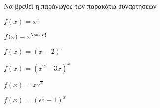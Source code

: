 Να βρεθεί η παράγωγος των παρακάτω συναρτήσεων
\begin{alist}
\item $ f(x)=x^x $
\item $ f(x)=x^{\hm{x}} $
\item $ f(x)=(x-2)^x $
\item $ f(x)=(x^2-3x)^{x} $
\item $ f(x)=x^{\sqrt{x}} $
\item $ f(x)=(e^x-1)^x $
\end{alist}
